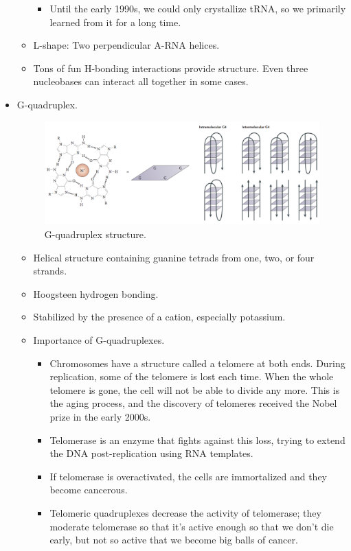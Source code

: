\documentclass[../notes.tex]{subfiles}
\begin{document}
\begin{itemize}
\begin{itemize}
\begin{itemize}
            \item Until the early 1990s, we could only crystallize tRNA, so we primarily learned from it for a long time.
        \end{itemize}
        \item L-shape: Two perpendicular A-RNA helices.
        \item Tons of fun H-bonding interactions provide structure. Even three nucleobases can interact all together in some cases.
    \end{itemize}
    \item G-quadruplex.
    \begin{figure}[h!]
        \centering
        \includegraphics[width=0.9\linewidth]{../ExtFiles/gQuadruplex.png}
        \caption{G-quadruplex structure.}
        \label{fig:gQuadruplex}
    \end{figure}
    \begin{itemize}
        \item Helical structure containing guanine tetrads from one, two, or four strands.
        \item Hoogsteen hydrogen bonding.
        \item Stabilized by the presence of a cation, especially potassium.
        \item Importance of G-quadruplexes.
        \begin{itemize}
            \item Chromosomes have a structure called a telomere at both ends. During replication, some of the telomere is lost each time. When the whole telomere is gone, the cell will not be able to divide any more. This is the aging process, and the discovery of telomeres received the Nobel prize in the early 2000s.
            \item Telomerase is an enzyme that fights against this loss, trying to extend the DNA post-replication using RNA templates.
            \item If telomerase is overactivated, the cells are immortalized and they become cancerous.
            \item Telomeric quadruplexes decrease the activity of telomerase; they moderate telomerase so that it's active enough so that we don't die early, but not so active that we become big balls of cancer.

\end{itemize}
\end{itemize}
\end{itemize}
\end{document}

